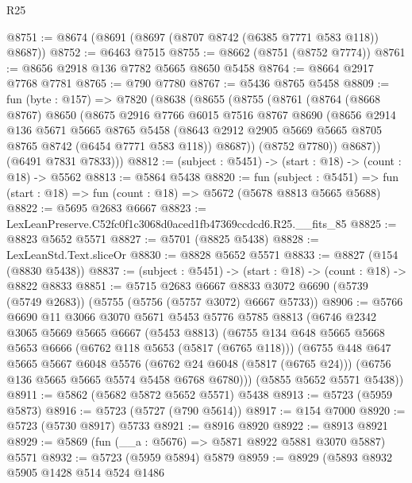 \begin{lexlean}{R25}
\begin{coremodule}
@8751 := @8674 (@8691 (@8697 (@8707 @8742 (@6385 @7771 @583 @118)) @8687))
@8752 := @6463 @7515
@8755 := @8662 (@8751 (@8752 @7774))
@8761 := @8656 @2918 @136 @7782 @5665 @8650 @5458
@8764 := @8664 @2917 @7768 @7781
@8765 := @790 @7780
@8767 := @5436 @8765 @5458
@8809 := fun (byte : @157) =>
  @7820
    (@8638
      (@8655
        (@8755
          (@8761
            (@8764
              (@8668 @8767)
              @8650
              (@8675
                @2916
                @7766
                @6015
                @7516
                @8767
                @8690
                (@8656
                  @2914
                  @136
                  @5671
                  @5665
                  @8765
                  @5458
                  (@8643 @2912 @2905 @5669 @5665 @8705 @8765 @8742 (@6454 @7771 @583 @118))
                  @8687))
              (@8752 @7780))
            @8687))
        (@6491 @7831 @7833)))
@8812 := (subject : @5451) -> (start : @18) -> (count : @18) -> @5562
@8813 := @5864 @5438
@8820 := fun (subject : @5451) =>
  fun (start : @18) => fun (count : @18) => @5672 (@5678 @8813 @5665 @5688)
@8822 := @5695 @2683 @6667
@8823 := LexLeanPreserve.C52fc0f1c3068d0aced1fb47369ccdcd6.R25.__fits_85
@8825 := @8823 @5652 @5571
@8827 := @5701 (@8825 @5438)
@8828 := LexLeanStd.Text.sliceOr
@8830 := @8828 @5652 @5571
@8833 := @8827 (@154 (@8830 @5438))
@8837 := (subject : @5451) -> (start : @18) -> (count : @18) -> @8822 @8833
@8851 := @5715
    @2683
    @6667
    @8833
    @3072
    @6690
    (@5739 (@5749 @2683))
    (@5755 (@5756 (@5757 @3072) @6667 @5733))
@8906 := @5766
    @6690
    @11
    @3066
    @3070
    @5671
    @5453
    @5776
    @5785
    @8813
    (@6746
      @2342
      @3065
      @5669
      @5665
      @6667
      (@5453 @8813)
      (@6755
        @134
        @648
        @5665
        @5668
        @5653
        @6666
        (@6762 @118 @5653 (@5817 (@6765 @118)))
        (@6755
          @448
          @647
          @5665
          @5667
          @6048
          @5576
          (@6762 @24 @6048 (@5817 (@6765 @24)))
          (@6756 @136 @5665 @5665 @5574 @5458 @6768 @6780)))
      (@5855 @5652 @5571 @5438))
@8911 := @5862 (@5682 @5872 @5652 @5571) @5438
@8913 := @5723 (@5959 @5873)
@8916 := @5723 (@5727 (@790 @5614))
@8917 := @154 @7000
@8920 := @5723 (@5730 @8917) @5733
@8921 := @8916 @8920
@8922 := @8913 @8921
@8929 := @5869 (fun (__a : @5676) => @5871 @8922 @5881 @3070 @5887) @5571
@8932 := @5723 (@5959 @5894) @5879
@8959 := @8929
    (@5893
      @8932
      @5905
      @1428
      @514
      @524
      @1486

\end{coremodule}
\end{lexlean}
